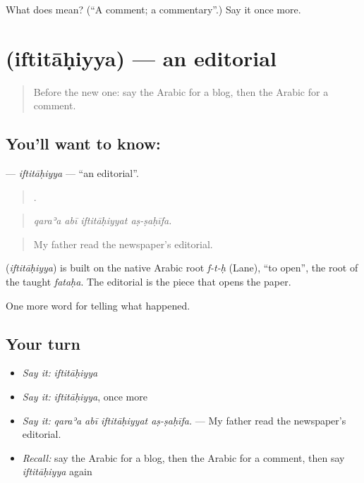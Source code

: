 \begin{tcolorbox}[breakable,colback=teal!4,colframe=teal!35!black,title={Before you move on}]
What does  mean? (\textquotedblleft{}A comment; a commentary\textquotedblright{}.) Say it once more.
\end{tcolorbox}
\section[\texorpdfstring{\ar{افتتاحية} (iftitāḥiyya)}{افتتاحية (iftitāḥiyya)}]{ (iftitāḥiyya) — an editorial}

\label{lesson:AR-C355-iftitahiyya}



\begin{quote}
Before the new one: say the Arabic for a blog, then the Arabic for a comment.
\end{quote}

\subsection*{You'll want to know: }
\textbf{} — \emph{iftitāḥiyya} — \textquotedblleft{}an editorial\textquotedblright{}.

\begin{quote}
   .
\end{quote}

\begin{quote}
\emph{qaraʾa abī iftitāḥiyyat aṣ-ṣaḥīfa.}
\end{quote}

\begin{quote}
My father read the newspaper’s editorial.
\end{quote}

\begin{cousinweb}
\textbf{} (\emph{iftitāḥiyya}) is built on the native Arabic root \emph{f-t-ḥ} (Lane), \textquotedblleft{}to open\textquotedblright{}, the root of the taught \emph{fataḥa}. The editorial is the piece that opens the paper.
\end{cousinweb}

\begin{grammarlens}[title={What you've built}]
One more word for telling what happened.
\end{grammarlens}

\subsection*{Your turn}
\begin{itemize}
\raggedright
  \item \emph{Say it:} \emph{iftitāḥiyya}
  \item \emph{Say it:} \emph{iftitāḥiyya}, once more
  \item \emph{Say it:} \emph{qaraʾa abī iftitāḥiyyat aṣ-ṣaḥīfa.} — My father read the newspaper’s editorial.
  \item \emph{Recall:} say the Arabic for a blog, then the Arabic for a comment, then say \emph{iftitāḥiyya} again
\end{itemize}

